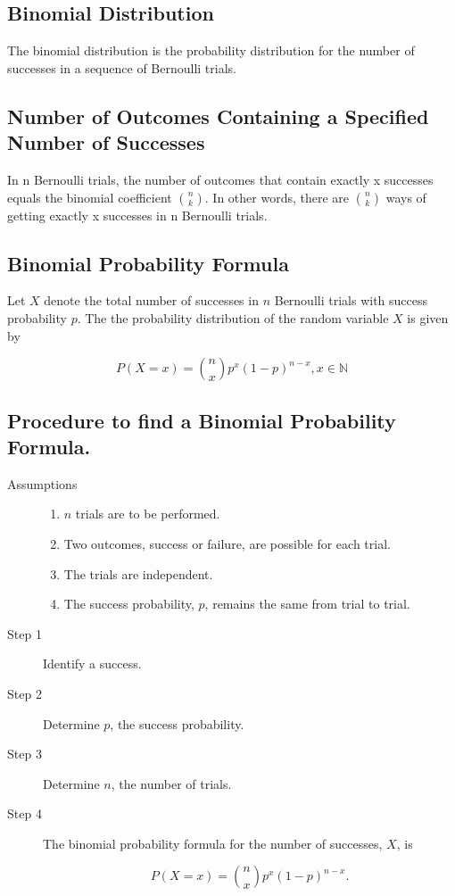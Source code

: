 \documentclass[12pt]{article}
\begin{document}
        \subsection*{Binomial Distribution}
            The binomial distribution is the probability distribution for the number of successes in a
            sequence of Bernoulli trials.
        \subsection*{Number of Outcomes Containing a Specified Number of Successes}
            In n Bernoulli trials, the number of outcomes that contain exactly x successes equals the
            binomial coefficient ${n \choose k}$. In other words, there are ${n \choose k}$ ways of getting
            exactly x successes in n Bernoulli trials.
        \subsection*{Binomial Probability Formula}
            Let $X$ denote the total number of successes in $n$ Bernoulli trials with success probability
            $p$. The the probability distribution of the random variable $X$ is given by
            \begin{center}
                \[
                    P(X = x) = {n \choose x}p^x(1 - p)^{n-x}, x \in \mathbb{N}
                \]
            \end{center}
        \subsection*{Procedure to find a Binomial Probability Formula.}
            \begin{description}
                \item[Assumptions]
                \begin{enumerate}
                    \item $n$ trials are to be performed.
                    \item Two outcomes, success or failure, are possible for each trial.
                    \item The trials are independent.
                    \item The success probability, $p$, remains the same from trial to trial.                
                \end{enumerate}
                \item[Step 1] Identify a success.
                \item[Step 2] Determine $p$, the success probability.
                \item[Step 3] Determine $n$, the number of trials.
                \item[Step 4] The binomial probability formula for the number of successes, $X$, is
                \begin{center}
                    \[
                        P(X = x) = {n \choose x}p^x(1 - p)^{n-x}.    
                    \]
                \end{center}
            \end{description}
\end{document}
